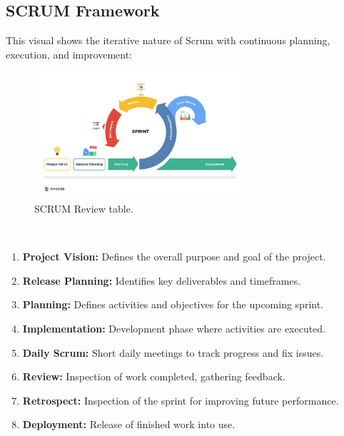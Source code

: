 \subsection{SCRUM Framework}
This visual shows the iterative nature of Scrum with continuous planning, execution, and improvement:
\begin{figure}[htbp]
    \centering
    \includegraphics[width=0.7\textwidth]{figures/Sprint-review-table-2-1.jpg} 
    \caption{SCRUM Review table.}
\end{figure} \ 
\begin{enumerate}
    \item \textbf{Project Vision:} Defines the overall purpose and goal of the project.
    \item \textbf{Release Planning:} Identifies key deliverables and timeframes.
    \item \textbf{Planning:} Defines activities and objectives for the upcoming sprint.
    \item \textbf{Implementation:} Development phase where activities are executed.
    \item \textbf{Daily Scrum:} Short daily meetings to track progress and fix issues.
    \item \textbf{Review:} Inspection of work completed, gathering feedback.
    \item \textbf{Retrospect:} Inspection of the sprint for improving future performance.
    \item \textbf{Deployment:} Release of finished work into use.
\end{enumerate}
